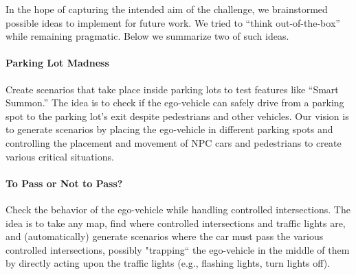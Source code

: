 \documentclass[conference]{IEEEtran}
\begin{document}
In the hope of capturing the intended aim of the challenge, we brainstormed possible ideas to implement for future work. We tried to ``think out-of-the-box'' while remaining pragmatic. Below we summarize two of such ideas.

\paragraph{Parking Lot Madness}
Create scenarios that take place inside parking lots to test features like ``Smart Summon.'' The idea is to check if the ego-vehicle can safely drive from a parking spot to the parking lot's exit despite pedestrians and other vehicles. Our vision is to generate scenarios by placing the ego-vehicle in different parking spots and controlling the placement and movement of NPC cars and pedestrians to create various critical situations.

\paragraph{To Pass or Not to Pass?}
Check the behavior of the ego-vehicle while handling controlled intersections. 
The idea is to take any map, find where controlled intersections and traffic lights are, and (automatically) generate scenarios where the car must pass the various controlled intersections, possibly "trapping`` the ego-vehicle in the middle of them by directly acting upon the traffic lights (e.g., flashing lights, turn lights off).
%
%



\end{document}
